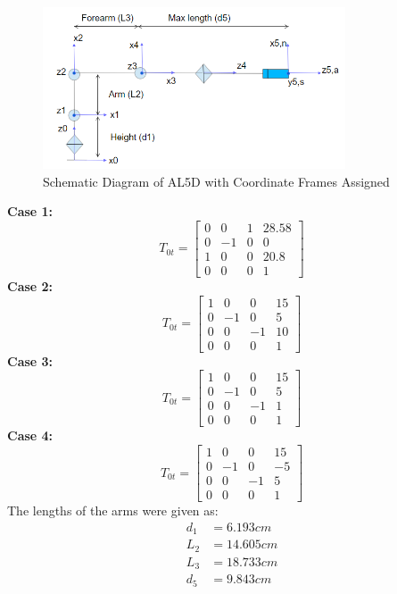 \documentclass[12pt]{article}
\begin{document}
\begin{figure}[H]
    \centering
    \includegraphics[width=0.8\textwidth]{frames.png}
    \caption{Schematic Diagram of AL5D with Coordinate Frames Assigned}
    \label{fig:frames}
\end{figure}
\noindent
\textbf{Case 1:}\\
\[
T_{0t} =
\begin{bmatrix}
         0 & 0 & 1 & 28.58\\
         0 & -1 & 0 & 0\\
         1 & 0 & 0 & 20.8\\
         0 & 0 & 0 & 1
\end{bmatrix}
\]
\textbf{Case 2:}\\
\[
T_{0t} =
\begin{bmatrix}
         1 & 0 & 0 & 15\\
         0 & -1 & 0 & 5\\
         0 & 0 & -1 & 10\\
         0 & 0 & 0 & 1
\end{bmatrix}
\]
\textbf{Case 3:}\\
\[
T_{0t} =
\begin{bmatrix}
         1 & 0 & 0 & 15\\
         0 & -1 & 0 & 5\\
         0 & 0 & -1 & 1\\
         0 & 0 & 0 & 1
\end{bmatrix}
\]
\textbf{Case 4:}\\
\[
T_{0t} =
\begin{bmatrix}
         1 & 0 & 0 & 15\\
         0 & -1 & 0 & -5\\
         0 & 0 & -1 & 5\\
         0 & 0 & 0 & 1
\end{bmatrix}
\]
The lengths of the arms were given as:
\begin{align*}
    d_1 &= 6.193 cm\\
    L_2 &= 14.605 cm\\
    L_3 &= 18.733 cm\\
    d_5 &= 9.843 cm\\
\end{align*}
\pagebreak
\end{document}
